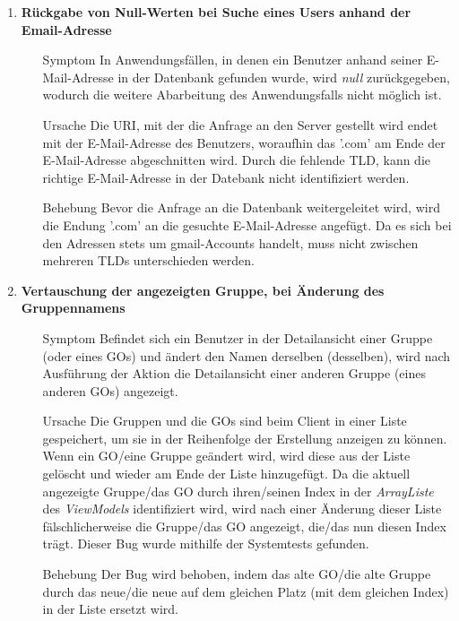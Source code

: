 \documentclass[11pt,a4paper]{scrartcl}
\def\threedigits#1{%
  \ifnum#1<100 0\fi
  \ifnum#1<10 0\fi
  \number#1}
\begin{document}
\begin{enumerate}[label={\textbf{/B\protect\threedigits{\theenumi}0/}}, leftmargin=*]
\item \textbf{Rückgabe von Null-Werten bei Suche eines Users anhand der Email-Adresse}
	\begin{itemize}
		\item[Symptom] In Anwendungsfällen, in denen ein Benutzer anhand seiner E-Mail-Adresse in der Datenbank gefunden wurde, wird \textit{null} zurückgegeben, wodurch die weitere Abarbeitung des Anwendungsfalls nicht möglich ist.
		\item[Ursache] Die URI, mit der die Anfrage an den Server gestellt wird endet mit der E-Mail-Adresse des Benutzers, woraufhin das '.com' am Ende der E-Mail-Adresse abgeschnitten wird. Durch die fehlende TLD, kann die richtige E-Mail-Adresse in der Datebank nicht identifiziert werden.
		\item[Behebung] Bevor die Anfrage an die Datenbank weitergeleitet wird, wird die Endung '.com' an die gesuchte E-Mail-Adresse angefügt. Da es sich bei den Adressen stets um gmail-Accounts handelt, muss nicht zwischen mehreren TLDs unterschieden werden.
	\end{itemize}
	
\item \textbf{Vertauschung der angezeigten Gruppe, bei Änderung des Gruppennamens}
	\begin{itemize}
		\item[Symptom] Befindet sich ein Benutzer in der Detailansicht einer Gruppe (oder eines GOs) und ändert den Namen derselben (desselben), wird nach Ausführung der Aktion die Detailansicht einer anderen Gruppe (eines anderen GOs) angezeigt.
		\item[Ursache] Die Gruppen und die GOs sind beim Client in einer Liste gespeichert, um sie in der Reihenfolge der Erstellung anzeigen zu können. Wenn ein GO/eine Gruppe geändert wird, wird diese aus der Liste gelöscht und wieder am Ende der Liste hinzugefügt. Da die aktuell angezeigte Gruppe/das GO durch ihren/seinen Index in der \textit{ArrayListe} des \textit{ViewModels} identifiziert wird, wird nach einer Änderung dieser Liste fälschlicherweise die Gruppe/das GO angezeigt, die/das nun diesen Index trägt. Dieser Bug wurde mithilfe der Systemtests gefunden.
		\item[Behebung] Der Bug wird behoben, indem das alte GO/die alte Gruppe durch das neue/die neue auf dem gleichen Platz (mit dem gleichen Index) in der Liste ersetzt wird.
	\end{itemize}
	

\end{enumerate}
\end{document}
